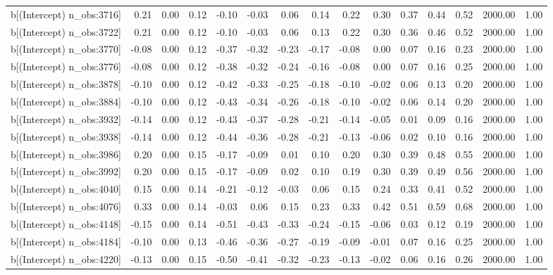 \begin{table}[ht]
\begin{tabular}{rrrrrrrrrrrrrrr}
  b[(Intercept) n\_obs:3716] & 0.21 & 0.00 & 0.12 & -0.10 & -0.03 & 0.06 & 0.14 & 0.22 & 0.30 & 0.37 & 0.44 & 0.52 & 2000.00 & 1.00 \\ 
  b[(Intercept) n\_obs:3722] & 0.21 & 0.00 & 0.12 & -0.10 & -0.03 & 0.06 & 0.13 & 0.22 & 0.30 & 0.36 & 0.46 & 0.52 & 2000.00 & 1.00 \\ 
  b[(Intercept) n\_obs:3770] & -0.08 & 0.00 & 0.12 & -0.37 & -0.32 & -0.23 & -0.17 & -0.08 & 0.00 & 0.07 & 0.16 & 0.23 & 2000.00 & 1.00 \\ 
  b[(Intercept) n\_obs:3776] & -0.08 & 0.00 & 0.12 & -0.38 & -0.32 & -0.24 & -0.16 & -0.08 & 0.00 & 0.07 & 0.16 & 0.25 & 2000.00 & 1.00 \\ 
  b[(Intercept) n\_obs:3878] & -0.10 & 0.00 & 0.12 & -0.42 & -0.33 & -0.25 & -0.18 & -0.10 & -0.02 & 0.06 & 0.13 & 0.20 & 2000.00 & 1.00 \\ 
  b[(Intercept) n\_obs:3884] & -0.10 & 0.00 & 0.12 & -0.43 & -0.34 & -0.26 & -0.18 & -0.10 & -0.02 & 0.06 & 0.14 & 0.20 & 2000.00 & 1.00 \\ 
  b[(Intercept) n\_obs:3932] & -0.14 & 0.00 & 0.12 & -0.43 & -0.37 & -0.28 & -0.21 & -0.14 & -0.05 & 0.01 & 0.09 & 0.16 & 2000.00 & 1.00 \\ 
  b[(Intercept) n\_obs:3938] & -0.14 & 0.00 & 0.12 & -0.44 & -0.36 & -0.28 & -0.21 & -0.13 & -0.06 & 0.02 & 0.10 & 0.16 & 2000.00 & 1.00 \\ 
  b[(Intercept) n\_obs:3986] & 0.20 & 0.00 & 0.15 & -0.17 & -0.09 & 0.01 & 0.10 & 0.20 & 0.30 & 0.39 & 0.48 & 0.55 & 2000.00 & 1.00 \\ 
  b[(Intercept) n\_obs:3992] & 0.20 & 0.00 & 0.15 & -0.17 & -0.09 & 0.02 & 0.10 & 0.19 & 0.30 & 0.39 & 0.49 & 0.56 & 2000.00 & 1.00 \\ 
  b[(Intercept) n\_obs:4040] & 0.15 & 0.00 & 0.14 & -0.21 & -0.12 & -0.03 & 0.06 & 0.15 & 0.24 & 0.33 & 0.41 & 0.52 & 2000.00 & 1.00 \\ 
  b[(Intercept) n\_obs:4076] & 0.33 & 0.00 & 0.14 & -0.03 & 0.06 & 0.15 & 0.23 & 0.33 & 0.42 & 0.51 & 0.59 & 0.68 & 2000.00 & 1.00 \\ 
  b[(Intercept) n\_obs:4148] & -0.15 & 0.00 & 0.14 & -0.51 & -0.43 & -0.33 & -0.24 & -0.15 & -0.06 & 0.03 & 0.12 & 0.19 & 2000.00 & 1.00 \\ 
  b[(Intercept) n\_obs:4184] & -0.10 & 0.00 & 0.13 & -0.46 & -0.36 & -0.27 & -0.19 & -0.09 & -0.01 & 0.07 & 0.16 & 0.25 & 2000.00 & 1.00 \\ 
  b[(Intercept) n\_obs:4220] & -0.13 & 0.00 & 0.15 & -0.50 & -0.41 & -0.32 & -0.23 & -0.13 & -0.02 & 0.06 & 0.16 & 0.26 & 2000.00 & 1.00 \\ 

\end{tabular}
\end{table}
